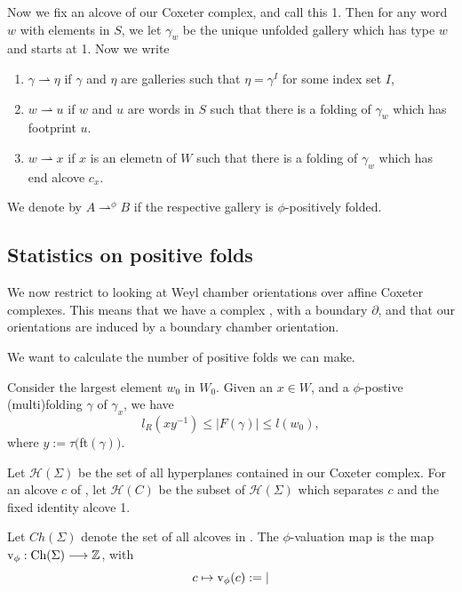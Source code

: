 \documentclass[11pt]{article}
\begin{document}
Now we fix an alcove of our Coxeter complex, and call this 1. Then for any word $w$ with elements in $S$, we let $\gamma_w$ be the unique unfolded gallery which has type $w$ and starts at 1. Now we write
\begin{enumerate}
    \item $\gamma \rightharpoonup \eta$ if $\gamma$ and $\eta$ are galleries such that $\eta = \gamma^I$ for some index set $I$,
    \item $w\rightharpoonup u$ if $w$ and $u$ are words in $S$ such that there is a folding of $\gamma_w$ which has footprint $u$.
    \item $w\rightharpoonup x$ if $x$ is an elemetn of $W$ such that there is a folding of $\gamma_w$ which has end alcove $c_x$. 
\end{enumerate}
We denote by $A\rightharpoonup^{\phi} B$ if the respective gallery is $\phi$-positively folded.

\subsection{Statistics on positive folds}

We now restrict to looking at Weyl chamber orientations over affine Coxeter complexes. This means that we have a complex \sg, with a boundary $\partial$\sg, and that our orientations are induced by a boundary chamber orientation. 

We want to calculate the number of positive folds we can make.

\begin{proposition}
    Consider the largest element $w_0$ in $W_0$. Given an $x\in W$, and a $\phi$-postive (multi)folding $\gamma$ of $\gamma_x$, we have
    \[l_R(xy^{-1})\leq |F(\gamma)|\leq l(w_0),\]
    where $y:=\tau($ft$(\gamma))$.
\end{proposition}

\begin{definition}
    Let $\mathcal{H}(\Sigma)$ be the set of all hyperplanes contained in our Coxeter complex. For an alcove $c$ of \sg, let $\mathcal{H}(C)$ be the subset of $\mathcal{H}(\Sigma)$ which separates $c$ and the fixed identity alcove 1. 
\end{definition}


\begin{definition}
    Let $Ch(\Sigma)$ denote the set of all alcoves in \sg. The $\phi$-valuation map is the map $\textnormal{v}_\phi:\textnormal{Ch}(\Sigma)\longrightarrow\mathbb{Z}$, with
    \[c\mapsto \textnormal{v}_\phi(c):= |\]
\end{definition}
\end{document}

